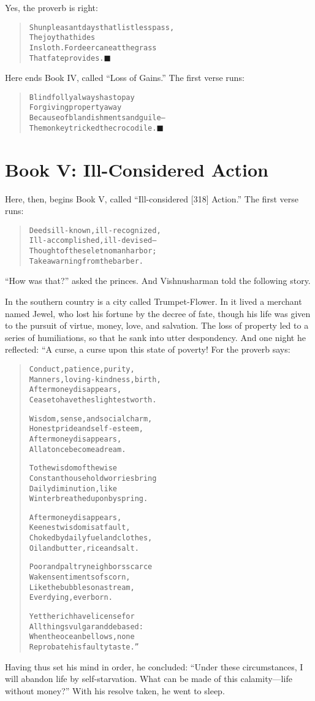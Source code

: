 \documentclass[article, twoside, 14pt]{memoir}
\newcommand{\qed}{\hfill \ensuremath{\blacksquare}}
\renewenvironment{verbatim}{%
\begin{quote}%
\vskip -10pt%
\begin{alltt}\normalfont\large}{\end{alltt}%
\end{quote}%
\vskip -10pt
} %
\begin{document}
Yes, the proverb is right:

\begin{verbatim}
Shun pleasant days that listless pass,
    The joy that hides
In sloth. For deer can eat the grass
    That fate provides.\hyperref[s66]{\qed}
\end{verbatim}
Here ends Book IV, called ``Loss of Gains.'' The first verse runs:

\begin{verbatim}
Blind folly always has to pay
For giving property away
Because of blandishments and guile--
The monkey tricked the crocodile.\hyperref[s65]{\qed}
\end{verbatim}
\section{Book V: Ill-Considered Action}

\label{s78}

Here, then, begins Book V, called ``Ill-considered [318] Action.''
The first verse runs:

\begin{verbatim}
Deeds ill-known, ill-recognized,
Ill-accomplished, ill-devised--
Thought of these let no man harbor;
Take a warning from the barber.
\end{verbatim}
``How was that?'' asked the princes. And Vishnusharman told the
following story.

In the southern country is a city called \label{s79}Trumpet-Flower.
In it lived a merchant named Jewel, who lost his fortune by the
decree of fate, though his life was given to the pursuit of virtue,
money, love, and salvation. The loss of property led to a series of
humiliations, so that he sank into utter despondency. And one night
he reflected: “A curse, a curse upon this state of poverty! For the
proverb says:

\begin{verbatim}
Conduct, patience, purity,
    Manners, loving-kindness, birth,
After money disappears,
    Cease to have the slightest worth.

Wisdom, sense, and social charm,
    Honest pride and self-esteem,
After money disappears,
    All at once become a dream.

To the wisdom of the wise
    Constant household worries bring
Daily diminution, like
    Winter breathed upon by spring.

After money disappears,
    Keenest wisdom is at fault,
Choked by daily fuel and clothes,
    Oil and butter, rice and salt.

Poor and paltry neighbors scarce
    Waken sentiments of scorn,
Like the bubbles on a stream,
    Ever dying, ever born.

Yet the rich have license for
    All things vulgar and debased:
When the ocean bellows, none
    Reprobate his faulty taste.”
\end{verbatim}
Having thus set his mind in order, he concluded:
``Under these circumstances, I will abandon life by self-starvation. What can be made of this calamity---life without money?''
With his resolve taken, he went to sleep.
\end{document}
